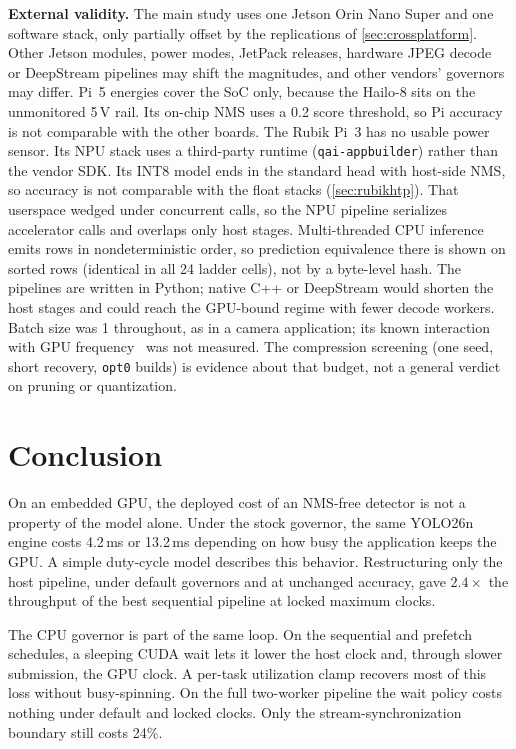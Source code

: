 \textbf{External validity.}
The main study uses one Jetson Orin Nano Super and one software stack,
only partially offset by the replications of \cref{sec:crossplatform}. Other Jetson modules, power modes, JetPack releases, hardware
JPEG decode~\cite{chen2026nvjpeg} or DeepStream pipelines may shift the
magnitudes, and other vendors' governors may differ. Pi~5
energies cover the SoC only, because the Hailo-8 sits on the unmonitored
5\,V rail. Its on-chip NMS uses a 0.2 score threshold, so Pi accuracy is
not comparable with the other boards. The Rubik Pi~3 has no usable power
sensor. Its NPU stack uses a third-party runtime
(\texttt{qai-appbuilder}) rather than the vendor SDK. Its INT8 model
ends in the standard head with host-side NMS, so accuracy is not comparable with the float
stacks (\cref{sec:rubikhtp}). That userspace wedged under concurrent
calls, so the NPU pipeline serializes accelerator calls and overlaps
only host stages. Multi-threaded CPU inference emits rows in
nondeterministic order, so prediction equivalence there is shown on
sorted rows (identical in all 24 ladder cells), not by a byte-level
hash. The pipelines are
written in Python; native C++ or DeepStream would shorten the
host stages and could reach the GPU-bound regime with fewer decode
workers. Batch size was 1 throughout, as in a camera application;
its known interaction with GPU frequency~\cite{nabavinejad2022batching}
was not measured. The compression screening (one seed, short recovery,
\texttt{opt0} builds) is evidence about that budget, not a
general verdict on pruning or quantization.

\section{Conclusion}
\label{sec:conclusion}

On an embedded GPU, the deployed cost of an NMS-free detector is not a
property of the model alone. Under the stock governor, the same
YOLO26n engine costs 4.2\,ms or 13.2\,ms depending on how busy the
application keeps the GPU. A simple duty-cycle model describes this
behavior. Restructuring only the host pipeline, under default governors
and at unchanged accuracy, gave $2.4\times$ the throughput of the best
sequential pipeline at locked maximum clocks.

The CPU governor is part of the same loop. On the sequential and
prefetch schedules, a sleeping CUDA wait lets it lower the host clock
and, through slower submission, the GPU clock. A per-task utilization
clamp recovers most of this loss without busy-spinning. On the full
two-worker pipeline the wait policy costs nothing under default and
locked clocks. Only the stream-synchronization boundary still costs
24\%.

